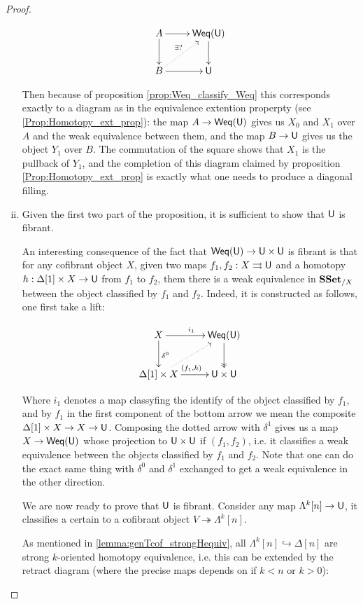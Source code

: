 \documentclass[reqno,10pt,a4paper,oneside,draft]{amsart}
\begin{document}
\begin{proof}
\begin{enumerate}[(i)]
\[\xymatrix{ A \ar[d] \ar[r] & \mathsf{Weq}(\U) \ar[d] \\
B \ar[r] \ar@{.>}[ur]^{\exists ?} & \U 
}\]

Then because of proposition \ref{prop:Weq_classify_Weq} this corresponds exactly to a diagram as in the equivalence extention properpty (see \ref{Prop:Homotopy_ext_prop}): the map $A \rightarrow  \mathsf{Weq}(\mathsf{U})$ gives us $X_0$ and $X_1$ over $A$ and the weak equivalence between them, and the map $B \rightarrow \mathsf{U}$ gives us the object $Y_1$ over $B$. The commutation of the square shows that $X_1$ is the pullback of $Y_1$, and the completion of this diagram claimed by proposition \ref{Prop:Homotopy_ext_prop} is exactly what one needs to produce a diagonal filling.

\item Given the first two part of the proposition, it is sufficient to show that $\mathsf{U}$ is fibrant.

An interesting consequence of the fact that $\mathsf{Weq}(\mathsf{U}) \rightarrow \mathsf{U} \times \mathsf{U}$ is fibrant is that for any cofibrant object $X$, given two maps $f_1,f_2:X \rightrightarrows \mathsf{U}$ and a homotopy $h:\Delta[1] \times X \rightarrow \mathsf{U}$ from $f_1$ to $f_2$, them there is a weak equivalence in $\mathbf{SSet}_{/X}$ between the object classified by $f_1$ and $f_2$. Indeed, it is constructed as follows, one first take a lift:

\[\xymatrix{ X \ar[r]^{i_1} \ar[d]^{\delta^0} & \mathsf{Weq}(\U) \ar@{->>}[d] \\
\Delta[1] \times X \ar[r]^{(f_1,h)} \ar@{.>}[ur] & \U \times \U
}\]

Where $i_1$ denotes a map classyfing the identify of the object classified by $f_1$, and by $f_1$ in the first component of the bottom arrow we mean the composite $\Delta[1] \times X \rightarrow X \rightarrow \mathsf{U}$. Composing the dotted arrow with $\delta^1$ gives us a map $X \rightarrow  \mathsf{Weq}(\mathsf{U})$ whose projection to $\mathsf{U} \times \mathsf{U}$ if $(f_1,f_2)$, i.e. it classifies a weak equivalence between the objects classified by $f_1$ and $f_2$. Note that one can do the exact same thing with $\delta^0$ and $\delta^1$ exchanged to get a weak equivalence in the other direction.


We are now ready to prove that $\mathsf{U}$ is fibrant. Consider any map $\Lambda^k[n] \rightarrow \mathsf{U} $, it classifies a certain to a cofibrant object $V \twoheadrightarrow \Lambda^k[n]$.

As mentioned in \ref{lemma:genTcof_strongHequiv}, all $\Lambda^k [n] \hookrightarrow \Delta[n]$ are strong $k$-oriented homotopy equivalence, i.e. this can be extended by the retract diagram (where the precise maps depends on if $k<n$ or $k>0$):


\end{enumerate}
\end{proof}
\end{document}
